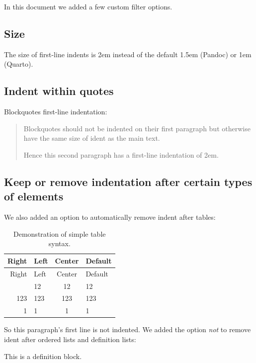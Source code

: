 In this document we added a few custom filter options.

\subsection{Size}\label{size}

The size of first-line indents is 2em instead of the default 1.5em
(Pandoc) or 1em (Quarto).

\subsection{Indent within quotes}\label{indent-within-quotes}

Blockquotes first-line indentation:

\begin{quote}
\noindent Blockquotes should not be indented on their first paragraph
but otherwise have the same size of ident as the main text.

Hence this second paragraph has a first-line indentation of 2em.
\end{quote}

\subsection{Keep or remove indentation after certain types of
elements}\label{keep-or-remove-indentation-after-certain-types-of-elements}

We also added an option to automatically remove indent after tables:

\begin{longtable}[]{@{}rlcl@{}}
\caption{Demonstration of simple table syntax.}\tabularnewline
\toprule\noalign{}
Right & Left & Center & Default \\
\midrule\noalign{}
\endfirsthead
\toprule\noalign{}
Right & Left & Center & Default \\
\midrule\noalign{}
\endhead
\bottomrule\noalign{}
\endlastfoot
12 & 12 & 12 & 12 \\
123 & 123 & 123 & 123 \\
1 & 1 & 1 & 1 \\
\end{longtable}

\noindent So this paragraph's first line is not indented. We added the
option \emph{not} to remove ident after ordered lists and definition
lists:

\begin{description}
\tightlist
\item[Definition]
This is a definition block.
\end{description}

